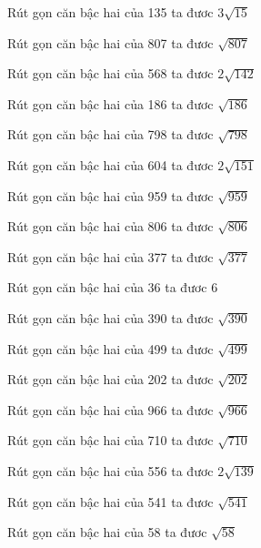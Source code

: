 \documentclass[12pt,a4paper]{article}
\begin{document}
\begin{ex}
Rút gọn căn bậc hai của 135 ta đươc $3\sqrt{15}$
\end{ex}
\begin{ex}
Rút gọn căn bậc hai của 807 ta đươc $\sqrt{807}$
\end{ex}
\begin{ex}
Rút gọn căn bậc hai của 568 ta đươc $2\sqrt{142}$
\end{ex}
\begin{ex}
Rút gọn căn bậc hai của 186 ta đươc $\sqrt{186}$
\end{ex}
\begin{ex}
Rút gọn căn bậc hai của 798 ta đươc $\sqrt{798}$
\end{ex}
\begin{ex}
Rút gọn căn bậc hai của 604 ta đươc $2\sqrt{151}$
\end{ex}
\begin{ex}
Rút gọn căn bậc hai của 959 ta đươc $\sqrt{959}$
\end{ex}
\begin{ex}
Rút gọn căn bậc hai của 806 ta đươc $\sqrt{806}$
\end{ex}
\begin{ex}
Rút gọn căn bậc hai của 377 ta đươc $\sqrt{377}$
\end{ex}
\begin{ex}
Rút gọn căn bậc hai của 36 ta đươc $6$
\end{ex}
\begin{ex}
Rút gọn căn bậc hai của 390 ta đươc $\sqrt{390}$
\end{ex}
\begin{ex}
Rút gọn căn bậc hai của 499 ta đươc $\sqrt{499}$
\end{ex}
\begin{ex}
Rút gọn căn bậc hai của 202 ta đươc $\sqrt{202}$
\end{ex}
\begin{ex}
Rút gọn căn bậc hai của 966 ta đươc $\sqrt{966}$
\end{ex}
\begin{ex}
Rút gọn căn bậc hai của 710 ta đươc $\sqrt{710}$
\end{ex}
\begin{ex}
Rút gọn căn bậc hai của 556 ta đươc $2\sqrt{139}$
\end{ex}
\begin{ex}
Rút gọn căn bậc hai của 541 ta đươc $\sqrt{541}$
\end{ex}
\begin{ex}
Rút gọn căn bậc hai của 58 ta đươc $\sqrt{58}$
\end{ex}
\end{document}
